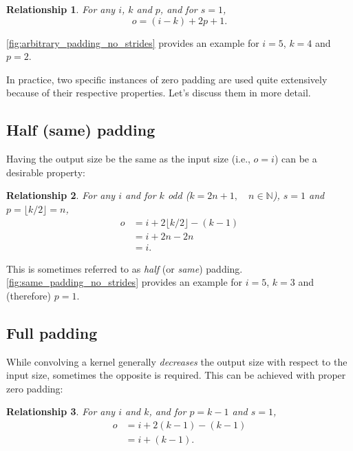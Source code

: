 \documentclass[notitlepage]{report}
\newtheorem{relationship}{Relationship}
\begin{document}
\begin{relationship}\label{rel:arbitrary_padding_no_strides}
For any $i$, $k$ and $p$, and for $s = 1$,
\begin{equation*}
    o = (i - k) + 2p + 1.
\end{equation*}
\end{relationship}

\noindent \autoref{fig:arbitrary_padding_no_strides} provides an example for $i
= 5$, $k = 4$ and $p = 2$.

In practice, two specific instances of zero padding are used quite extensively
because of their respective properties. Let's discuss them in more detail.

\subsection{Half (same) padding}

Having the output size be the same as the input size (i.e., $o = i$) can be a
desirable property:

\begin{relationship}\label{rel:same_padding_no_strides}
For any $i$ and for $k$ odd ($k = 2n + 1, \quad n \in \mathbb{N}$), $s = 1$ and
$p = \lfloor k / 2 \rfloor = n$,
\begin{equation*}
\begin{split}
    o &= i + 2 \lfloor k / 2 \rfloor - (k - 1) \\
      &= i + 2n - 2n \\
      &= i.
\end{split}
\end{equation*}
\end{relationship}

\noindent This is sometimes referred to as {\em half\/} (or {\em same\/})
padding. \autoref{fig:same_padding_no_strides} provides an example for
$i = 5$, $k = 3$ and (therefore) $p = 1$.

\subsection{Full padding}

While convolving a kernel generally {\em decreases\/} the output size with
respect to the input size, sometimes the opposite is required. This can be
achieved with proper zero padding:

\begin{relationship}\label{rel:full_padding_no_strides}
For any $i$ and $k$, and for $p = k - 1$ and $s = 1$,
\begin{equation*}
\begin{split}
    o &= i + 2(k - 1) - (k - 1) \\
      &= i + (k - 1).
\end{split}
\end{equation*}
\end{relationship}
\end{document}
